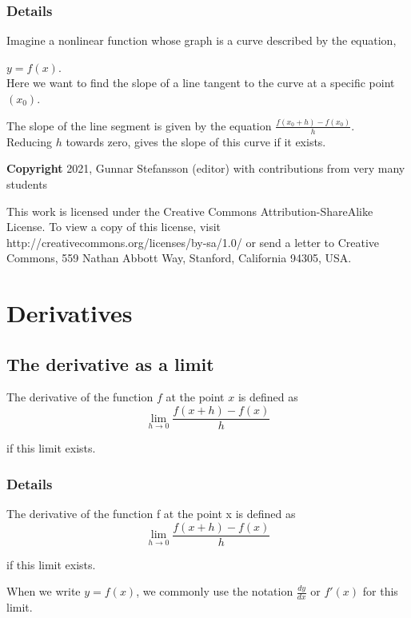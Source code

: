 \documentclass[12pt,a4paper]{article}
\theoremstyle{regla}
\theoremstyle{remark}
\theoremstyle{definition}
\theoremstyle{nonumberbreak}
\begin{document}
\subsubsection{Details}
Imagine a nonlinear function whose graph is a curve described by the equation, 

$y = f(x) $.\\ 

Here we want to find the slope of a line tangent to the curve at a specific point $(x_0)$.


The slope of the line segment is given by the equation
$  \frac{f (x_0 +h) - f(x_0)} {h}$.\\ 

Reducing $h$ towards zero, gives the slope of this curve if it exists.



{\bf Copyright}
2021, Gunnar Stefansson (editor) with contributions from very many students

This work is licensed under the Creative Commons
Attribution-ShareAlike License. To view a copy of this license, visit
http://creativecommons.org/licenses/by-sa/1.0/ or send a letter to
Creative Commons, 559 Nathan Abbott Way, Stanford, California 94305,
USA.
\clearpage
\section{Derivatives}
\subsection{The derivative as a limit}
\begin{fbox}
\begin{minipage}{0.97\textwidth}
The derivative of the function $f$ at the point $x$ is defined as
$$\lim_{h \to 0} \frac{f(x+h) - f(x)}{h}$$

if this limit exists.


\end{minipage}
\end{fbox}
\subsubsection{Details}
\begin{defn}
The derivative of the function f at the point x is defined as
$$\lim_{h \to 0} \frac{f(x+h) -f(x)}{h}$$

if this limit exists.
\end{defn}
When we write $y = f(x)$, we commonly use the notation 
$\frac{dy}{dx}$ or $f'(x)$ for this limit.
\end{document}
